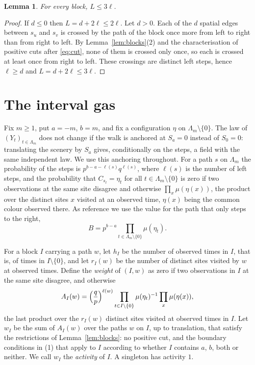 \documentclass[11pt]{amsart}
\newtheorem{lemma}[theorem]{Lemma}
\theoremstyle{remark}
\begin{document}
\begin{lemma}\label{lem:third}
For every block, $L\le3\ell$.
\end{lemma}

\begin{proof}
If $d\le0$ then $L=d+2\ell\le2\ell$. Let $d>0$. Each of the $d$ spatial edges between $s_u$ and $s_v$ is crossed by the
path of the block once more from left to right than from right to left. By Lemma~\ref{lem:blocks}(2) and the
characterisation of positive cuts after \eqref{eq:cut}, none of them is crossed only once, so each is crossed at least
once from right to left. These crossings are distinct left steps, hence $\ell\ge d$ and $L=d+2\ell\le3\ell$.
\end{proof}

\section{The interval gas}\label{sec:gas}

Fix $m\ge1$, put $a=-m$, $b=m$, and fix a configuration $\eta$ on $\Lambda_m\setminus\{0\}$. The law of
$(Y_t)_{t\in\Lambda_m}$ does not change if the walk is anchored at $S_a=0$ instead of $S_0=0$: translating the scenery
by $S_a$ gives, conditionally on the steps, a field with the same independent law. We use this anchoring throughout.
For a path $s$ on $\Lambda_m$ the probability of the steps is $p^{b-a-\ell(s)}q^{\ell(s)}$, where $\ell(s)$ is the number
of left steps, and the probability that $C_{s_t}=\eta_t$ for all $t\in\Lambda_m\setminus\{0\}$ is zero if two
observations at the same site disagree and otherwise $\prod_x\mu(\eta(x))$, the product over the distinct sites $x$
visited at an observed time, $\eta(x)$ being the common colour observed there. As reference we use the value for the
path that only steps to the right,
\[
B=p^{b-a}\prod_{t\in\Lambda_m\setminus\{0\}}\mu(\eta_t).
\]

For a block $I$ carrying a path $w$, let $h_I$ be the number of observed times in $I$, that is, of times in
$I\setminus\{0\}$, and let $r_I(w)$ be the number of distinct sites visited by $w$ at observed times. Define the
\emph{weight} of $(I,w)$ as zero if two observations in $I$ at the same site disagree, and otherwise
\begin{equation}\label{eq:weight}
A_I(w)=\Bigl(\frac qp\Bigr)^{\ell(w)}\prod_{t\in I\setminus\{0\}}\mu(\eta_t)^{-1}\prod_x\mu(\eta(x)),
\end{equation}
the last product over the $r_I(w)$ distinct sites visited at observed times in $I$. Let $w_I$ be the sum of $A_I(w)$
over the paths $w$ on $I$, up to translation, that satisfy the restrictions of Lemma~\ref{lem:blocks}: no positive cut,
and the boundary conditions in (1) that apply to $I$ according to whether $I$ contains $a$, $b$, both or neither. We call
$w_I$ the \emph{activity} of $I$. A singleton has activity $1$.
\end{document}
